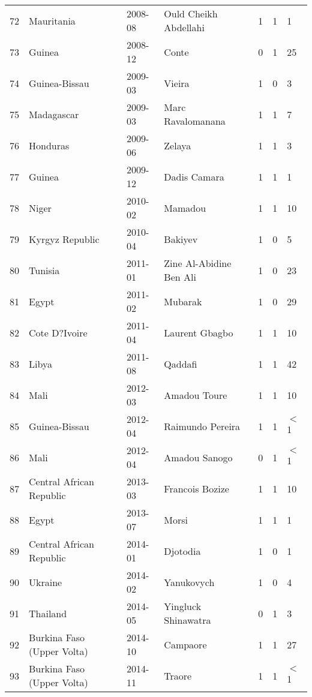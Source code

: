 \documentclass[pdftex,11pt]{article}
\begin{document}
\begin{table*}
\begin{tabular}{rlllrrl}
  72 & Mauritania & 2008-08 & Ould Cheikh Abdellahi & 1 & 1 & 1 \\ 
  73 & Guinea & 2008-12 & Conte & 0 & 1 & 25 \\ 
  74 & Guinea-Bissau & 2009-03 & Vieira & 1 & 0 & 3 \\ 
  75 & Madagascar & 2009-03 & Marc Ravalomanana & 1 & 1 & 7 \\ 
  76 & Honduras & 2009-06 & Zelaya & 1 & 1 & 3 \\ 
  77 & Guinea & 2009-12 & Dadis Camara & 1 & 1 & 1 \\ 
  78 & Niger & 2010-02 & Mamadou & 1 & 1 & 10 \\ 
  79 & Kyrgyz Republic & 2010-04 & Bakiyev & 1 & 0 & 5 \\ 
  80 & Tunisia & 2011-01 & Zine Al-Abidine Ben Ali & 1 & 0 & 23 \\ 
  81 & Egypt & 2011-02 & Mubarak & 1 & 0 & 29 \\ 
  82 & Cote D?Ivoire & 2011-04 & Laurent Gbagbo & 1 & 1 & 10 \\ 
  83 & Libya & 2011-08 & Qaddafi & 1 & 1 & 42 \\ 
  84 & Mali & 2012-03 & Amadou Toure & 1 & 1 & 10 \\ 
  85 & Guinea-Bissau & 2012-04 & Raimundo Pereira & 1 & 1 & $<$1 \\ 
  86 & Mali & 2012-04 & Amadou Sanogo & 0 & 1 & $<$1 \\ 
  87 & Central African Republic & 2013-03 & Francois Bozize & 1 & 1 & 10 \\ 
  88 & Egypt & 2013-07 & Morsi & 1 & 1 & 1 \\ 
  89 & Central African Republic & 2014-01 & Djotodia & 1 & 0 & 1 \\ 
  90 & Ukraine & 2014-02 & Yanukovych & 1 & 0 & 4 \\ 
  91 & Thailand & 2014-05 & Yingluck Shinawatra & 0 & 1 & 3 \\ 
  92 & Burkina Faso (Upper Volta) & 2014-10 & Campaore & 1 & 1 & 27 \\ 
  93 & Burkina Faso (Upper Volta) & 2014-11 & Traore & 1 & 1 & $<$1 \\ 
   \bottomrule
\end{tabular}
\end{table*}
\end{document}
